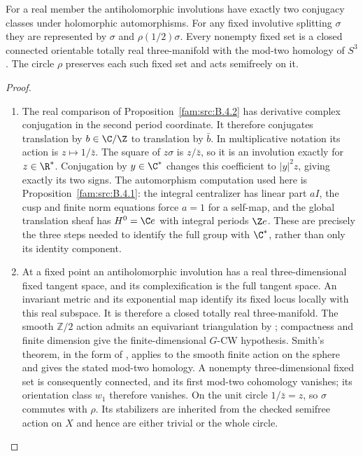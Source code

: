 \begin{proposition}\hypertarget{tag-02PE}{}\label{mapsI:src:A.3.1}

For a real member the antiholomorphic involutions have exactly two
conjugacy classes under holomorphic automorphisms. For any fixed
involutive splitting $\sigma$ they are represented by $\sigma$ and
$\rho(1/2)\sigma$. Every nonempty fixed set is a closed connected
orientable totally real three-manifold with the mod-two homology of
$S^3$. The circle $\rho$ preserves each such fixed set and acts
semifreely on it.
\end{proposition}



\begin{proof}
\begin{enumerate}[label=\arabic*.,leftmargin=*]
\item The real comparison of Proposition~\ref{fam:src:B.4.2} has derivative complex conjugation in the
second period coordinate. It therefore conjugates translation by
$b\in\C/\Z$ to translation by $\bar b$. In multiplicative notation its
action is $z\mapsto1/\bar z$. The square of $z\sigma$ is $z/\bar z$,
so it is an involution exactly for $z\in\R^*$. Conjugation by $y\in\C^*$
changes this coefficient to $|y|^2z$, giving exactly its two signs.
The automorphism computation used here is Proposition~\ref{fam:src:B.4.1}: the integral centralizer has linear part $aI$, the cusp and
finite norm equations force $a=1$ for a self-map, and the global
translation sheaf has $H^0=\C e$ with integral periods $\Z e$.
These are precisely the three steps needed to identify the full group
with $\C^*$, rather than only its identity component.

\item At a fixed point an antiholomorphic involution has a real three-dimensional
fixed tangent space, and its complexification is the full tangent space.
An invariant metric and its exponential map identify its fixed locus
locally with this real subspace. It is therefore a closed totally real
three-manifold. The smooth $\mathbb Z/2$ action admits an equivariant
triangulation by \cite[Theorem~3.1, p.~48]{Illman1972}; compactness and finite
dimension give the finite-dimensional $G$-CW hypothesis. Smith's theorem,
in the form of
\cite[Theorem 4.1(1)]{Knudson2004}, applies to the smooth finite action on
the sphere and gives the stated mod-two homology. A nonempty
three-dimensional fixed set is consequently connected, and its first
mod-two cohomology vanishes; its orientation class $w_1$ therefore
vanishes. On the unit circle $1/\bar z=z$, so $\sigma$ commutes with
$\rho$. Its stabilizers are inherited from the checked semifree action
on $X$ and hence are either trivial or the whole circle.
\end{enumerate}
\end{proof}

